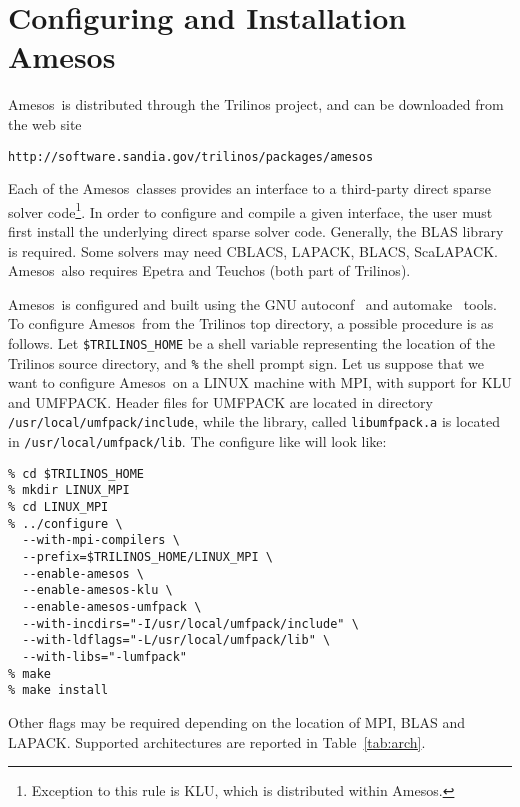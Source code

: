 \documentclass[11pt]{SANDreport}
\newcommand{\amesos}{{\sc Amesos}}
\begin{document}
\section{Configuring and Installation \amesos}
\label{sec:configuration}

\amesos\ is distributed through the Trilinos project, and can be
downloaded from the web site
\begin{verbatim}
http://software.sandia.gov/trilinos/packages/amesos
\end{verbatim}

\smallskip

Each of the \amesos\ classes provides an interface to a third-party direct
sparse solver code\footnote{Exception to this rule is KLU, which is
  distributed within \amesos.}. In order to configure and compile a given
interface, the user must first install the underlying direct sparse
solver code. Generally, the BLAS library is required. Some solvers may
need CBLACS, LAPACK, BLACS, ScaLAPACK. \amesos\ also requires Epetra and
Teuchos (both part of Trilinos).

\amesos\ is configured and built using the GNU autoconf~\cite{Autoconf}
and automake~\cite{Automake} tools. To configure \amesos\ from the
Trilinos top directory, a possible procedure is as follows.  Let
\verb!$TRILINOS_HOME! be a shell variable representing the location
of the Trilinos source directory, and \verb!%! the shell prompt sign.  
Let us suppose that we want to configure \amesos\ on a
LINUX machine with MPI, with support
for KLU and UMFPACK. Header files for UMFPACK are located
in directory \verb!/usr/local/umfpack/include!, while the library,
called \verb!libumfpack.a! is located in \verb!/usr/local/umfpack/lib!.
The configure like will look like:
\begin{verbatim}
% cd $TRILINOS_HOME
% mkdir LINUX_MPI
% cd LINUX_MPI
% ../configure \
  --with-mpi-compilers \
  --prefix=$TRILINOS_HOME/LINUX_MPI \
  --enable-amesos \
  --enable-amesos-klu \
  --enable-amesos-umfpack \
  --with-incdirs="-I/usr/local/umfpack/include" \
  --with-ldflags="-L/usr/local/umfpack/lib" \
  --with-libs="-lumfpack"
% make
% make install
\end{verbatim}
Other flags may be required depending on the location of
 MPI, BLAS and LAPACK. Supported architectures are reported 
 in Table~\ref{tab:arch}.
\end{document}
